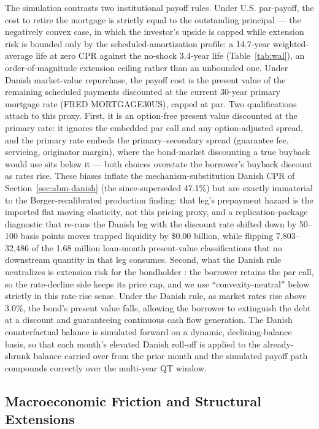 \documentclass[12pt]{article}
\begin{document}
The simulation contrasts two institutional payoff rules. Under U.S. par-payoff, the cost to retire the mortgage is strictly equal to the outstanding principal --- the negatively convex case, in which the investor's upside is capped while extension risk is bounded only by the scheduled-amortization profile: a 14.7-year weighted-average life at zero CPR against the no-shock 3.4-year life (Table~\ref{tab:wal}), an order-of-magnitude extension ceiling rather than an unbounded one. Under Danish market-value repurchase, the payoff cost is the present value of the remaining scheduled payments discounted at the current 30-year primary mortgage rate (FRED MORTGAGE30US), capped at par. Two qualifications attach to this proxy. First, it is an option-free present value discounted at the primary rate: it ignores the embedded par call and any option-adjusted spread, and the primary rate embeds the primary--secondary spread (guarantee fee, servicing, originator margin), where the bond-market discounting a true buyback would use sits below it --- both choices overstate the borrower's buyback discount as rates rise. These biases inflate the mechanism-substitution Danish CPR of Section~\ref{sec:abm-danish} (the since-superseded 47.1\%) but are exactly immaterial to the Berger-recalibrated production finding: that leg's prepayment hazard is the imported flat moving elasticity, not this pricing proxy, and a replication-package diagnostic that re-runs the Danish leg with the discount rate shifted down by 50--100 basis points moves trapped liquidity by \$0.00 billion, while flipping 7,803--32,486 of the 1.68 million loan-month present-value classifications that no downstream quantity in that leg consumes. Second, what the Danish rule neutralizes is extension risk for the bondholder \citep{berger2026}: the borrower retains the par call, so the rate-decline side keeps its price cap, and we use ``convexity-neutral'' below strictly in this rate-rise sense. Under the Danish rule, as market rates rise above 3.0\%, the bond's present value falls, allowing the borrower to extinguish the debt at a discount and guaranteeing continuous cash flow generation. The Danish counterfactual balance is simulated forward on a dynamic, declining-balance basis, so that each month's elevated Danish roll-off is applied to the already-shrunk balance carried over from the prior month and the simulated payoff path compounds correctly over the multi-year QT window.

\subsection{Macroeconomic Friction and Structural Extensions}\label{sec:method-frictions}
\end{document}
